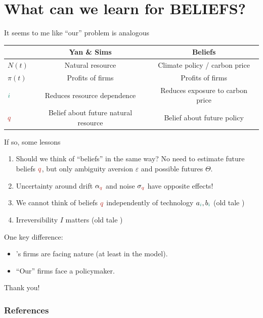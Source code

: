 \documentclass[12pt, aspectratio=169]{beamer}
\newcommand{\bel}[1]{{\color{BrickRed} #1}}
\newcommand{\tech}[1]{{\color{PineGreen} #1}}
\begin{document}
\section{What can we learn for BELIEFS?}

\begin{frame}
    It seems to me like ``our'' problem is analogous \begin{table}
        \centering
        \footnotesize
        \begin{tabular}{l|| c | c}
            & Yan \& Sims & Beliefs \\ \hline\hline
            $N(t)$ & Natural resource & Climate policy / carbon price \\ \hline
            $\pi(t)$ & Profits of firms & Profits of firms \\ \hline
            $\tech{i}$ & Reduces resource dependence & Reduces exposure to carbon price \\ \hline
            $\bel{q}$ & Belief about future natural resource & Belief about future policy
        \end{tabular}
    \end{table}
\end{frame}
\begin{frame}
    If so, some lessons \begin{enumerate} \setlength{\itemsep}{0.5em}
        \item Should we think of ``beliefs'' in the same way? No need to estimate future beliefs $\bel{q}$, but only ambiguity aversion $\varepsilon$ and possible futures $\Theta$.
        \pause \item Uncertainty around drift $\alpha_{\bel{q}}$ and noise $\sigma_{\bel{q}}$ have opposite effects!
        \pause \item We cannot think of beliefs $\bel{q}$ independently of technology $a_{\tech{i}}, b_{\tech{i}}$ (old tale \textcite{gilboaTheoryDecisionUncertainty2009}) 
        \pause \item Irreversibility $I$ matters (old tale \textcite{stokeyEconomicsInactionStochastic2008})
    \end{enumerate}
\end{frame}

\begin{frame}
    One key difference: \begin{itemize}
        \item[] \textcite{yan2025}'s firms are facing nature (at least in the model). 
        \item[] ``Our'' firms face a policymaker.
    \end{itemize}
\end{frame}

\begin{frame}[standout]
    Thank you!
\end{frame}


\begin{frame}[allowframebreaks]
\frametitle{References}
\printbibliography
\end{frame}
\end{document}
